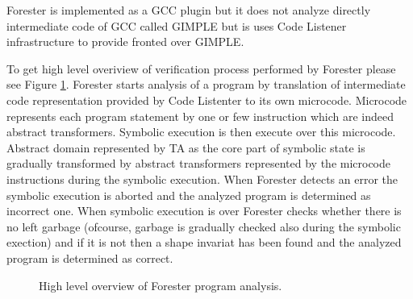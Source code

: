 Forester is implemented as a GCC plugin but it does not analyze directly intermediate code of GCC called GIMPLE but is
uses Code Listener infrastructure \cite{codelistnere} to provide fronted over GIMPLE.

To get high level overiview of verification process performed by Forester please see Figure \ref{fig:fa_exec}. 
Forester starts analysis of a program by translation of intermediate code representation provided by Code Listenter
to its own microcode.
Microcode represents each program statement by one or few instruction which are indeed abstract transformers.
Symbolic execution is then execute over this microcode.
Abstract domain represented by TA as the core part of symbolic state is gradually transformed by abstract transformers
represented by the microcode instructions during the symbolic execution.
When Forester detects an error the symbolic execution is aborted and the analyzed program is determined as incorrect one.
When symbolic execution is over Forester checks whether there is no left garbage (ofcourse, garbage is gradually checked also during the symbolic exection)
and if it is not then a shape invariat has been found and the analyzed program is determined as correct.

\begin{figure}[bt]
	\begin{center}
		
	\end{center}
	\caption{High level overview of Forester program analysis.}
	\label{fig:fa_exec}
\end{figure}

